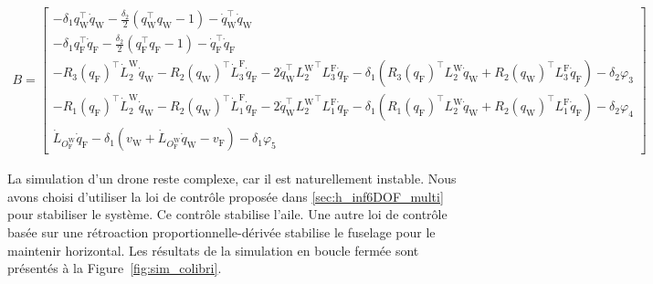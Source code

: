\begin{align}
    \label{eq:b_contraint}
    B = \begin{bmatrix}
            -\delta_{1} q_{\text{W}}^\top \dot{q}_{\text{W}} - \frac{\delta_{2}}{2} (q_{\text{W}}^\top q_{\text{W}} -1) - \dot{q}_{\text{W}}^\top \dot{q}_{\text{W}} \\
            -\delta_{1} q_{\text{F}}^\top \dot{q}_{\text{F}} - \frac{\delta_{2}}{2} (q_{\text{F}}^\top q_{\text{F}} -1) - \dot{q}_{\text{F}}^\top \dot{q}_{\text{F}} \\
            -R_{3}(q_{\text{F}})^\top \dot{L}_{2}^{\text{W}}\dot{q}_{\text{W}} - R_{2}(q_{\text{W}})^\top \dot{L}_{3}^{\text{F}} \dot{q}_{\text{F}} - 2\dot{q}_{\text{W}}^\top {L_{2}^{\text{W}}}^\top L_{3}^{\text{F}} \dot{q}_{\text{F}} - \delta_{1}(R_{3}(q_{\text{F}})^\top L_{2}^{\text{W}}\dot{q}_{\text{W}} +  R_{2}(q_{\text{W}})^\top L_{3}^{\text{F}} \dot{q}_{\text{F}} ) - \delta_{2}\varphi_{3}\\
            -R_{1}(q_{\text{F}})^\top \dot{L}_{2}^{\text{W}}\dot{q}_{\text{W}} - R_{2}(q_{\text{W}})^\top \dot{L}_{1}^{\text{F}} \dot{q}_{\text{F}} - 2\dot{q}_{\text{W}}^\top {L_{2}^{\text{W}}}^\top L_{1}^{\text{F}} \dot{q}_{\text{F}} - \delta_{1}(R_{1}(q_{\text{F}})^\top L_{2}^{\text{W}}\dot{q}_{\text{W}} +  R_{2}(q_{\text{W}})^\top L_{1}^{\text{F}} \dot{q}_{\text{F}} ) - \delta_{2} \varphi_{4}\\
            \dot{L}_{O_{\text{F}}^{\text{W}}} \dot{q}_{\text{F}}  - \delta_{1}( v_{\text{W}} + \dot{L}_{O_{\text{F}}^{\text{W}}} \dot{q}_{\text{W}} - v_{\text{F}}) - \delta_{1}\varphi_{5}
        \end{bmatrix}
\end{align}

La simulation d'un drone reste complexe, car il est naturellement instable. Nous avons choisi d'utiliser la loi de contrôle proposée dans \ref{sec:h_inf6DOF_multi} pour stabiliser le système. Ce contrôle stabilise l'aile. Une autre loi de contrôle basée sur une rétroaction proportionnelle-dérivée stabilise le fuselage pour le maintenir horizontal. Les résultats de la simulation en boucle fermée sont présentés à la Figure~\ref{fig:sim_colibri}.


